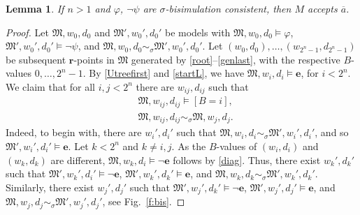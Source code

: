 \documentclass[10pt,a4paper]{amsart}
\theoremstyle{plain}
\newtheorem{lem}[thm]{Lemma}
\theoremstyle{definition}
\newcommand{\diag}{\fform{e}}
\newcommand{\fform}[1]{\boldsymbol{#1}}
\newcommand{\cR}{B}
\newcommand{\cvf}[3]{[{#1}\mathop{#2}{#3}]}
\newcommand{\inpw}{\overline{a}}
\newcommand{\start}{\fform{r}}
\newcommand{\grid}{\mathsf{equ}}
\begin{document}
	\begin{lem}\label{l:lbcompl}
		If $n>1$ and $\varphi$, $\neg\psi$ are $\sigma$-bisimulation consistent, then $M$ accepts $\inpw$.
	\end{lem}
	\begin{proof}
		Let $\mathfrak M,w_0,d_0$ and $\mathfrak M',w_0',d_0'$ be models with
		$\mathfrak M,w_0,d_0\models\varphi$, $\mathfrak M',w_0',d_0'\models\neg\psi$, and 
		$\mathfrak M,w_0,d_0\sim_\sigma\mathfrak M',w_0',d_0'$.
		Let $(w_0,d_0),\dots,(w_{2^n-1},d_{2^n-1})$ be subsequent $\start$-points in $\mathfrak M$ generated by 
		\eqref{root}--\eqref{genlast}, with the respective
		$\cR$-values $0,\dots,2^n\mathop{-}1$. 
		By \eqref{Utreefirst} and \eqref{startL}, we have $\mathfrak M,w_i,d_i\models\diag$, for $i<2^n$.
		We claim that for all $i,j<2^n$ there are $w_{ij},d_{ij}$ such that
		\begin{align}
			\label{cldsq}
			& \mathfrak M,w_{ij},d_{ij}\models\cvf{\cR}{=}{i},\\
			\label{clsim}
			& \mathfrak M,w_{ij},d_{ij}\sim_\sigma \mathfrak M,w_j,d_j.
		\end{align}
		Indeed, to begin with, there are $w_i',d_i'$ such that $\mathfrak M,w_i,d_i\sim_\sigma\mathfrak M',w_i',d_i'$, and so
		$\mathfrak M',w_i',d_i'\models\diag$. Let $k<2^n$ and $k\ne i,j$.
		As the $\cR$-values of $(w_i,d_i)$ and $(w_k,d_k)$ are different, 
		$\mathfrak M,w_k,d_i\models\neg\diag$ follows by \eqref{diag}.
		Thus, there exist $w_k',d_k'$ such that 
		$\mathfrak M',w_k',d_i'\models\neg\diag$, 
		$\mathfrak M',w_k',d_k'\models\diag$, and 
		$\mathfrak M,w_k,d_k\sim_\sigma\mathfrak M',w_k',d_k'$.
		Similarly, there exist $w_j',d_j'$ such that 
		$\mathfrak M',w_j',d_k'\models\neg\diag$, 
		$\mathfrak M',w_j',d_j'\models\diag$, and 
		$\mathfrak M,w_j,d_j\sim_\sigma\mathfrak M',w_j',d_j'$, see Fig.~\ref{f:bis}.
		

\end{proof}
\end{document}
